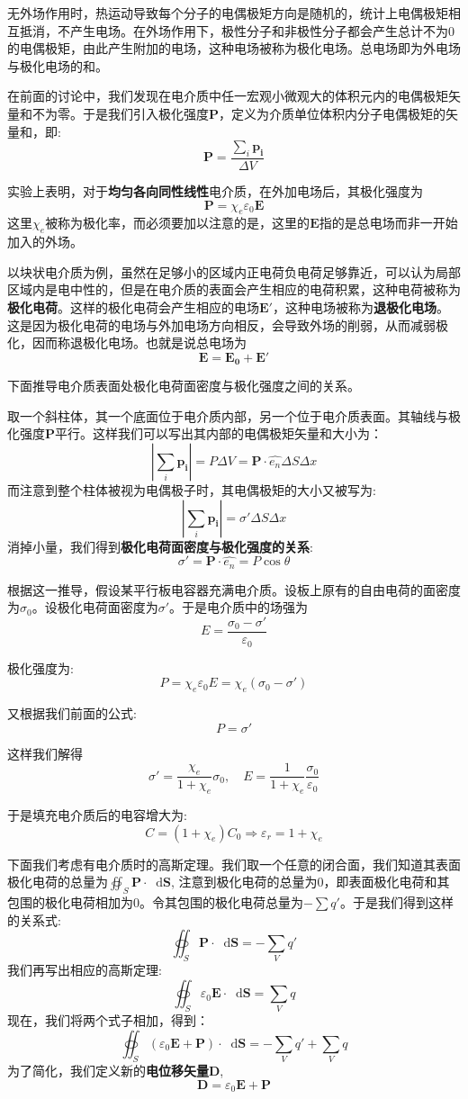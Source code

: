 \documentclass[12pt,a4paper,oneside]{report}
\theoremstyle{definition}
\theoremstyle{remark}
\renewcommand{\d}{\mathop{}\!\mathrm{d}}
\begin{document}
无外场作用时，热运动导致每个分子的电偶极矩方向是随机的，统计上电偶极矩相互抵消，不产生电场。在外场作用下，极性分子和非极性分子都会产生总计不为0的电偶极矩，由此产生附加的电场，这种电场被称为极化电场。总电场即为外电场与极化电场的和。

在前面的讨论中，我们发现在电介质中任一宏观小微观大的体积元内的电偶极矩矢量和不为零。于是我们引入极化强度$\mathbf{P}$，定义为介质单位体积内分子电偶极矩的矢量和，即:
\[
\mathbf{P}=\frac{\sum_i \mathbf{p_i}}{\Delta V}
\]

实验上表明，对于\textbf{均匀各向同性线性}电介质，在外加电场后，其极化强度为
\[
\mathbf{P}=\chi_e \varepsilon_0 \mathbf{E}
\]
这里$\chi_e$被称为极化率，而必须要加以注意的是，这里的$\mathbf{E}$指的是总电场而非一开始加入的外场。

以块状电介质为例，虽然在足够小的区域内正电荷负电荷足够靠近，可以认为局部区域内是电中性的，但是在电介质的表面会产生相应的电荷积累，这种电荷被称为\textbf{极化电荷}。这样的极化电荷会产生相应的电场$\mathbf{E'}$，这种电场被称为\textbf{退极化电场}。这是因为极化电荷的电场与外加电场方向相反，会导致外场的削弱，从而减弱极化，因而称退极化电场。也就是说总电场为
\[
\mathbf{E}=\mathbf{E_0}+\mathbf{E'}
\]

下面推导电介质表面处极化电荷面密度与极化强度之间的关系。

取一个斜柱体，其一个底面位于电介质内部，另一个位于电介质表面。其轴线与极化强度$\mathbf{P}$平行。这样我们可以写出其内部的电偶极矩矢量和大小为：
\[
|\sum_i\mathbf{p_i}|=P\Delta V = \mathbf{P} \cdot \hat{e_n} \Delta S \Delta x
\]
而注意到整个柱体被视为电偶极子时，其电偶极矩的大小又被写为:
\[
|\sum_i\mathbf{p_i}| = \sigma' \Delta S \Delta x
\]
消掉小量，我们得到\textbf{极化电荷面密度与极化强度的关系}:
\[
\sigma' = \mathbf{P} \cdot \hat{e_n} = P\cos\theta
\]

根据这一推导，假设某平行板电容器充满电介质。设板上原有的自由电荷的面密度为$\sigma_0$。设极化电荷面密度为$\sigma'$。于是电介质中的场强为 
\[
E=\frac{\sigma_0-\sigma'}{\varepsilon_0}
\]

极化强度为:
\[
P=\chi_e\varepsilon_0 E=\chi_e(\sigma_0-\sigma')
\]

又根据我们前面的公式:
\[
P=\sigma'
\]

这样我们解得
\[
\sigma' = \frac{\chi_e}{1+\chi_e}\sigma_0 ,\quad E= \frac{1}{1+\chi_e} \frac{\sigma_0}{\varepsilon_0}
\]

于是填充电介质后的电容增大为:
\[
C=(1+\chi_e)C_0 \Rightarrow \varepsilon_r = 1+\chi_e
\]

下面我们考虑有电介质时的高斯定理。我们取一个任意的闭合面，我们知道其表面极化电荷的总量为$\oiint_S \mathbf{P} \cdot \d \mathbf{S}$, 注意到极化电荷的总量为0，即表面极化电荷和其包围的极化电荷相加为0。令其包围的极化电荷总量为$-\sum q'$。于是我们得到这样的关系式:
\[
\oiint_S \mathbf{P} \cdot \d \mathbf{S}  = -\sum_V q'
\]
我们再写出相应的高斯定理:
\[
\oiint_S \varepsilon_0 \mathbf{E} \cdot \d \mathbf{S}  = \sum_V q
\]
现在，我们将两个式子相加，得到：
\[
\oiint_S (\varepsilon_0 \mathbf{E} + \mathbf{P}) \cdot \d \mathbf{S} = -\sum_V q' + \sum_V q
\]
为了简化，我们定义新的\textbf{电位移矢量}$\mathbf{D}$,
\[
\mathbf{D} = \varepsilon_0\mathbf{E}+\mathbf{P}
\]
\end{document}
